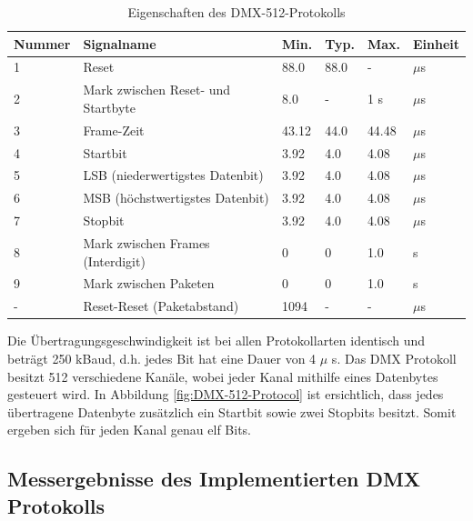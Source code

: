 \begin{table}[H]
\begin{tabular}{p{1.5cm} | p{6.5cm} | p{1cm} | p{1cm} | p{1cm} | p{1cm}}
  \textbf{Nummer} & \textbf{Signalname} & \textbf{Min.} & \textbf{Typ.} & \textbf{Max.} & \textbf{Einheit} \\ 
  \hline
  1 & Reset & 88.0 & 88.0 & - & $\mu$s \\
  2 & Mark zwischen Reset- und Startbyte & 8.0 & - & 1 s & $\mu$s \\
  3 & Frame-Zeit & 43.12 & 44.0 & 44.48 & $\mu$s \\
  4 & Startbit & 3.92 & 4.0 & 4.08 & $\mu$s \\
  5 & LSB (niederwertigstes Datenbit) & 3.92 & 4.0 & 4.08 & $\mu$s \\
  6 & MSB (höchstwertigstes Datenbit) & 3.92 & 4.0 & 4.08 & $\mu$s \\
  7 & Stopbit & 3.92 & 4.0 & 4.08 & $\mu$s \\
  8 & Mark zwischen Frames (Interdigit) & 0 & 0 & 1.0 & s \\
  9 & Mark zwischen Paketen & 0 & 0 & 1.0 & s \\
  - & Reset-Reset (Paketabstand) & 1094 & - & - & $\mu$s \\
 \end{tabular}
 \caption{Eigenschaften des DMX-512-Protokolls}
 \label{table:DMX-512-Protocol}
\end{table}

Die Übertragungsgeschwindigkeit ist bei allen Protokollarten identisch und beträgt 250 kBaud, d.h. jedes Bit hat eine Dauer von 4 $\mu$ s. Das DMX Protokoll besitzt 512 verschiedene Kanäle, wobei jeder Kanal mithilfe eines Datenbytes gesteuert wird. In Abbildung \ref{fig:DMX-512-Protocol} ist ersichtlich, dass jedes übertragene Datenbyte zusätzlich ein Startbit sowie zwei Stopbits besitzt. Somit ergeben sich für jeden Kanal genau elf Bits.

\subsection{Messergebnisse des Implementierten DMX Protokolls}


